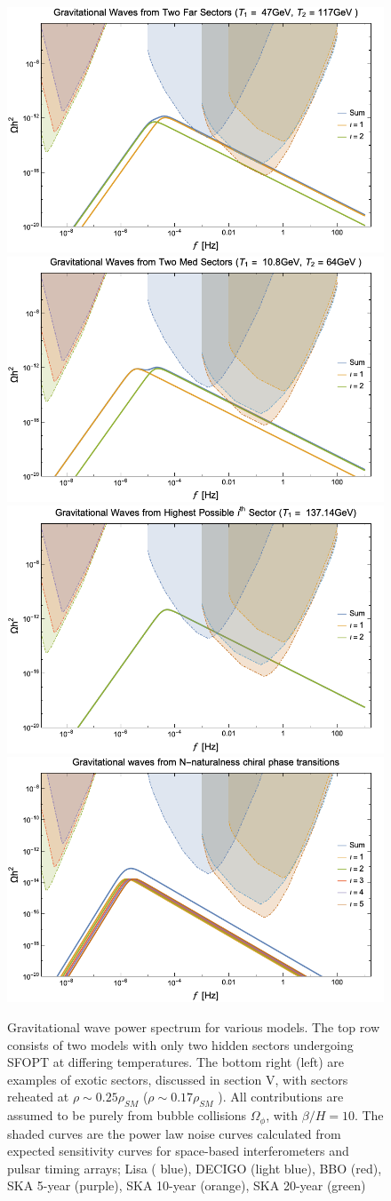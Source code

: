 \documentclass[nofootinbib,twocolumn,preprintnumbers]{revtex4-1}
\begin{document}
\begin{figure}[tb]
\centering
\begin{minipage}[c]{\textwidth}
\includegraphics[width=.45\textwidth]{TwoFar.png} 
\hfill
\includegraphics[width=.45\textwidth]{TwoMed.png} 
\hfill
\includegraphics[width=.45\textwidth ]{highest.png}
\hfill
\includegraphics[width=.45\textwidth]{energydensity.png} 
\end{minipage}
\hfill
\caption{ Gravitational wave power spectrum for various models. The top row consists of two models with only two hidden sectors undergoing SFOPT at differing temperatures. The bottom right (left) are examples of exotic sectors, discussed in section V, with sectors reheated at $\rho \sim 0.25\rho_{SM}$ ($\rho \sim 0.17\rho_{SM}$ ). All contributions are assumed to be purely from bubble collisions $\Omega_{\phi}$, with $\beta/H  = 10$.  The shaded curves are the power law noise curves calculated from expected sensitivity curves for space-based interferometers and pulsar timing arrays; Lisa ( blue), DECIGO (light blue), BBO (red), SKA 5-year (purple), SKA 10-year (orange), SKA 20-year (green)   }
\label{fig:Haa}
\end{figure}
\end{document}

